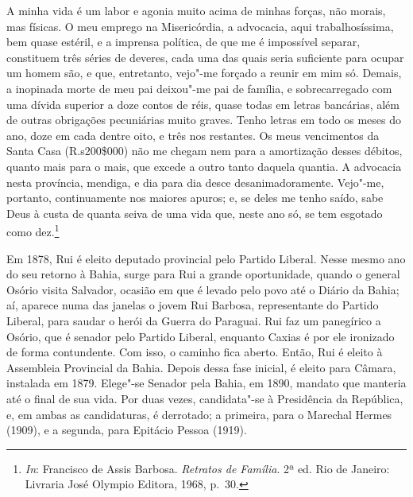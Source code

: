 \begin{hedraquote}
A minha vida é um labor e agonia muito acima de minhas forças, não
morais, mas físicas. O meu emprego na Misericórdia, a advocacia, aqui
trabalhosíssima, bem quase estéril, e a imprensa política, de que me é
impossível separar, constituem três séries de deveres, cada uma das
quais seria suficiente para ocupar um homem são, e que, entretanto,
vejo"-me forçado a reunir em mim só. Demais, a inopinada morte de meu
pai deixou"-me pai de família, e sobrecarregado com uma dívida superior
a doze contos de réis, quase todas em letras bancárias, além de outras
obrigações pecuniárias muito graves. Tenho letras em todo os meses do
ano, doze em cada dentre oito, e três nos restantes. Os meus
vencimentos da Santa Casa (R.s200\$000) não me chegam nem para a
amortização desses débitos, quanto mais para o mais, que excede a outro
tanto daquela quantia. A advocacia nesta província, mendiga, e dia para
dia desce desanimadoramente. Vejo"-me, portanto, continuamente nos
maiores apuros; e, se deles me tenho saído, sabe Deus à custa de quanta
seiva de uma vida que, neste ano só, se tem esgotado como dez.\footnote{ \textit{In}: 
Francisco de Assis Barbosa. \textit{Retratos de Família}. 2ª ed. Rio de 
Janeiro: Livraria José Olympio Editora, 1968, p.~30.}
\end{hedraquote}

Em 1878, Rui é eleito deputado provincial pelo Partido Liberal. Nesse
mesmo ano do seu retorno à Bahia, surge para Rui a grande oportunidade,
quando o general Osório visita Salvador, ocasião em que é levado pelo
povo até o Diário da Bahia; aí, aparece numa das janelas o jovem Rui
Barbosa, representante do Partido Liberal, para saudar o herói da
Guerra do Paraguai. Rui faz um panegírico a Osório, que é senador pelo
Partido Liberal, enquanto Caxias é por ele ironizado de forma
contundente. Com isso, o caminho fica aberto. Então, Rui é eleito à
Assembleia Provincial da Bahia. Depois dessa fase inicial, é eleito
para Câmara, instalada em 1879. Elege"-se Senador pela Bahia, em 1890,
mandato que manteria até o final de sua vida. Por duas vezes,
candidata"-se à Presidência da República, e, em ambas as candidaturas, é
derrotado; a primeira, para o Marechal Hermes (1909), e a segunda, para
Epitácio Pessoa (1919).

